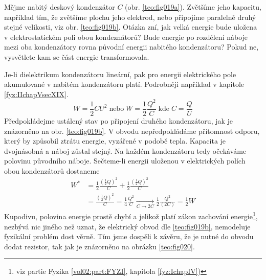 \begin{mdframed}[style=mdexam]
  \begin{example}\label{teo:exam019}
    Mějme nabitý deskový kondenzátor \(C\) (obr. \ref{teo:fig019a}). Zvětšíme jeho kapacitu,
    například tím, že zvětšíme plochu jeho elektrod, nebo připojíme paralelně druhý stejné
    velikosti, viz obr. \ref{teo:fig019b}. Otázka zní, jak velká energie bude uložena v
    elektrostatickém poli obou kondeznátorů? Bude energie po rozdělení náboje mezi oba kondenzátory
    rovna původní energii nabitého kondenzátoru? Pokud ne, vysvětlete kam se část energie
    transformovala. 
    
    {\centering
      \captionsetup{type=figure}
      \hspace{1em}
      \hspace{1em}
      \label{teo:fig019}
    \par}
    
    Je-li dielektrikum kondenzátoru lineární, pak pro energii elektrického pole akumulované v
    nabitém kondenzátoru platí. Podrobněji například v kapitole \ref{fyz:IIchapVsecXIX}.
    \begin{equation}
      W = \frac{1}{2}CU^2 \;\text{nebo}\; W = \frac{1}{2}\frac{Q^2}{C} \;\text{kde}\; 
      C = \frac{Q}{U}
    \end{equation}
    Předpokládejme ustálený stav po připojení druhého kondenzátoru, jak je znázorněno na obr.
    \ref{teo:fig019b}. V obvodu nepředpokládáme přítomnost odporu, který by způsobil ztrátu energie,
    vyzářené v podobě tepla. Kapacita je dvojnásobná a náboj zůstal stejný. Na každém kondenzátoru
    tedy očekáváme polovinu původního náboje. Sečteme-li energii uloženou v elektrických polích obou
    kondenzátorů dostaneme
    \begin{align*}
      W^* &= \frac{1}{2}\frac{(\frac{1}{2}Q)^2}{C} + \frac{1}{2}\frac{(\frac{1}{2}Q)^2}{C}   \\
          &= \frac{(\frac{1}{2}Q)^2}{C} =\frac{1}{4}\frac{Q^2}{C}                 
           \xrightarrow[C\rightarrow2C]{}
            \frac{1}{2}\frac{Q^2}{(2C)} = \frac{1}{2}W 
    \end{align*}
    Kupodivu, polovina energie prostě chybí a jelikož platí zákon zachování energie\footnote{viz
    partie Fyzika \ref{vol02:part:FYZI}, kapitola \ref{fyz:IchapIV})}, nezbývá nic jiného než uznat,
    že elektrický obvod dle \ref{teo:fig019b}, nemodeluje fyzikální problém dost věrně. Tím jsme
    dospěli k závěru, že je nutné do obvodu dodat rezistor, tak jak je znázorněno na obrázku
    \ref{teo:fig020}.
    

\end{example}
\end{mdframed}
